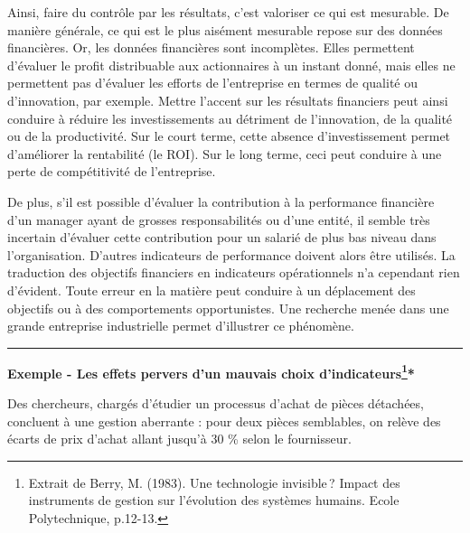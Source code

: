 \documentclass[oneside]{kaobook}
\begin{document}
Ainsi, faire du contrôle par les résultats, c’est valoriser ce qui est mesurable. De manière générale, ce qui est le plus aisément mesurable repose sur des données financières. Or, les données financières sont incomplètes. Elles permettent d’évaluer le profit distribuable aux actionnaires à un instant donné, mais elles ne permettent pas d’évaluer les efforts de l’entreprise en termes de qualité ou d’innovation, par exemple. Mettre l’accent sur les résultats financiers peut ainsi conduire à réduire les investissements au détriment de l’innovation, de la qualité ou de la productivité. Sur le court terme, cette absence d’investissement permet d’améliorer la rentabilité (le ROI). Sur le long terme, ceci peut conduire à une perte de compétitivité de l’entreprise. 

De plus, s’il est possible d’évaluer la contribution à la performance financière d’un manager ayant de grosses responsabilités ou d’une entité, il semble très incertain d’évaluer cette contribution pour un salarié de plus bas niveau dans l’organisation. D’autres indicateurs de performance doivent alors être utilisés. La traduction des objectifs financiers en indicateurs opérationnels n’a cependant rien d’évident. Toute erreur en la matière peut conduire à un déplacement des objectifs ou à des comportements opportunistes. Une recherche menée dans une grande entreprise industrielle permet d’illustrer ce phénomène.

\noindent\rule{\textwidth}{0.5pt}
\textbf{Exemple - Les effets pervers d'un mauvais choix d'indicateurs\footnote{Extrait de Berry, M. (1983). Une technologie invisible ? Impact des instruments de gestion sur l’évolution des systèmes humains. Ecole Polytechnique, p.12-13.}*}

Des chercheurs, chargés d’étudier un processus d’achat de pièces détachées, concluent à une gestion aberrante : pour deux pièces semblables, on relève des écarts de prix d’achat allant jusqu’à 30 \% selon le fournisseur.
\end{document}
